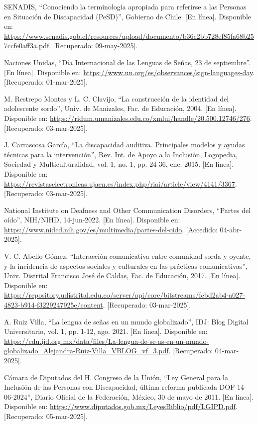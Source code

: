 \begin{thebibliography}{200}
    SENADIS, “Conociendo la terminología apropiada para referirse a las Personas en Situación de Discapacidad (PeSD)”, Gobierno de Chile. [En línea]. Disponible en: \url{https://www.senadis.gob.cl/resources/upload/documento/b36c2bb728ef85fa68b257ccfe0aff3a.pdf}. [Recuperado: 09-may-2025].

    Naciones Unidas, “Día Internacional de las Lenguas de Señas, 23 de septiembre”. [En línea]. Disponible en: \url{https://www.un.org/es/observances/sign-languages-day}. [Recuperado: 01-mar-2025].

    M. Restrepo Montes y L. C. Clavijo, “La construcción de la identidad del adolescente sordo”, Univ. de Manizales, Fac. de Educación, 2004. [En línea]. Disponible en: \url{https://ridum.umanizales.edu.co/xmlui/handle/20.500.12746/276}. [Recuperado: 03-mar-2025].

    J. Carrascosa García, “La discapacidad auditiva. Principales modelos y ayudas técnicas para la intervención”, Rev. Int. de Apoyo a la Inclusión, Logopedia, Sociedad y Multiculturalidad, vol. 1, no. 1, pp. 24-36, ene. 2015. [En línea]. Disponible en: \url{https://revistaselectronicas.ujaen.es/index.php/riai/article/view/4141/3367}. [Recuperado: 03-mar-2025].

    National Institute on Deafness and Other Communication Disorders, “Partes del oído”, NIH/NIHD, 14-jun-2022. [En línea]. Disponible en: \url{https://www.nidcd.nih.gov/es/multimedia/partes-del-oido}. [Accedido: 04-abr-2025]. 

    V. C. Abello Gómez, “Interacción comunicativa entre comunidad sorda y oyente, y la incidencia de aspectos sociales y culturales en las prácticas comunicativas”, Univ. Distrital Francisco José de Caldas, Fac. de Educación, 2017. [En línea]. Disponible en: \url{https://repository.udistrital.edu.co/server/api/core/bitstreams/fcbd2ab4-a027-4823-b914-f3229247925e/content}. [Recuperado: 03-mar-2025].

    A. Ruiz Villa, “La lengua de señas en un mundo globalizado”, IDJ: Blog Digital Universitario, vol. 1, pp. 1-12, ago. 2021. [En línea]. Disponible en: \url{https://edu.ijd.org.mx/data/files/La-lengua-de-se-as-en-un-mundo-globalizado_Alejandra-Ruiz-Villa_VBLOG_vf_3.pdf}. [Recuperado: 04-mar-2025].

    Cámara de Diputados del H. Congreso de la Unión, “Ley General para la Inclusión de las Personas con Discapacidad, última reforma publicada DOF 14-06-2024”, Diario Oficial de la Federación, México, 30 de mayo de 2011. [En línea]. Disponible en: \url{https://www.diputados.gob.mx/LeyesBiblio/pdf/LGIPD.pdf}. [Recuperado: 05-mar-2025].


\end{thebibliography}
